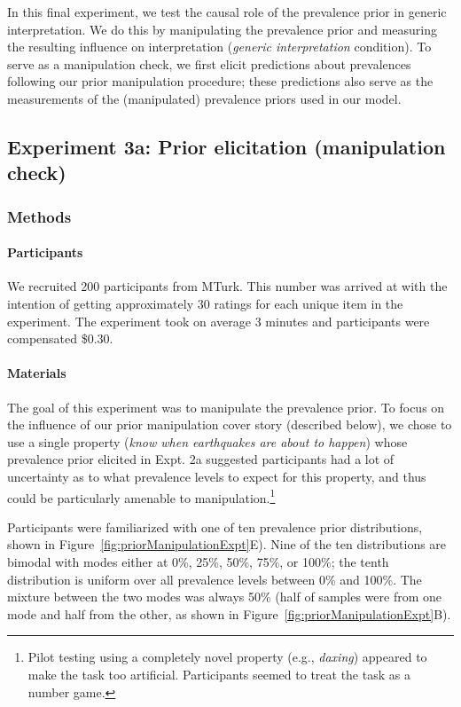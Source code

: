 \documentclass[floatsintext,doc]{apa6}
\theoremstyle{definition}
\theoremstyle{definition}
\theoremstyle{definition}
\theoremstyle{remark}
\begin{document}
In this final experiment, we test the causal role of the prevalence
prior in generic interpretation. We do this by manipulating the
prevalence prior and measuring the resulting influence on interpretation
(\emph{generic interpretation} condition). To serve as a manipulation
check, we first elicit predictions about prevalences following our prior
manipulation procedure; these predictions also serve as the measurements
of the (manipulated) prevalence priors used in our model.

\subsection{Experiment 3a: Prior elicitation (manipulation
check)}\label{experiment-3a-prior-elicitation-manipulation-check}

\subsubsection{Methods}\label{methods-2}

\paragraph{Participants}\label{participants-4}

We recruited 200 participants from MTurk. This number was arrived at
with the intention of getting approximately 30 ratings for each unique
item in the experiment. The experiment took on average 3 minutes and
participants were compensated \$0.30.

\paragraph{Materials}\label{materials-1}

The goal of this experiment was to manipulate the prevalence prior. To
focus on the influence of our prior manipulation cover story (described
below), we chose to use a single property (\emph{know when earthquakes
are about to happen}) whose prevalence prior elicited in Expt. 2a
suggested participants had a lot of uncertainty as to what prevalence
levels to expect for this property, and thus could be particularly
amenable to manipulation.\footnote{Pilot testing using a completely
  novel property (e.g., \emph{daxing}) appeared to make the task too
  artificial. Participants seemed to treat the task as a number game.}

Participants were familiarized with one of ten prevalence prior
distributions, shown in Figure~\ref{fig:priorManipulationExpt}E). Nine
of the ten distributions are bimodal with modes either at 0\%, 25\%,
50\%, 75\%, or 100\%; the tenth distribution is uniform over all
prevalence levels between 0\% and 100\%. The mixture between
the two modes was always 50\% (half of samples were from one mode and
half from the other, as shown in
Figure~\ref{fig:priorManipulationExpt}B).
\end{document}
